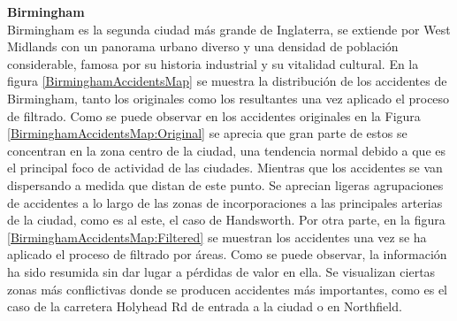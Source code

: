 \textbf{Birmingham}\\

Birmingham es la segunda ciudad más grande de Inglaterra, se extiende por West Midlands con un panorama urbano diverso y una densidad de población considerable, famosa por su historia industrial y su vitalidad cultural. En la figura \ref{BirminghamAccidentsMap} se muestra la distribución de los accidentes de Birmingham, tanto los originales como los resultantes una vez aplicado el proceso de filtrado. Como se puede observar en los accidentes originales en la Figura \ref{BirminghamAccidentsMap:Original} se aprecia que gran parte de estos se concentran en la zona centro de la ciudad, una  tendencia normal debido a que es el principal foco de actividad de las ciudades. Mientras que los accidentes se van dispersando a medida que distan de este punto. Se aprecian ligeras agrupaciones de accidentes a lo largo de las zonas de incorporaciones a las principales arterias de la ciudad, como es al este, el caso de Handsworth. Por otra parte, en la figura \ref{BirminghamAccidentsMap:Filtered} se muestran los accidentes una vez se ha aplicado el proceso de filtrado por áreas. Como se puede observar, la información ha sido resumida sin dar lugar a pérdidas de valor en ella. Se visualizan ciertas zonas más conflictivas donde se producen accidentes más importantes, como es el caso de la carretera Holyhead Rd de entrada a la ciudad o en Northfield.


